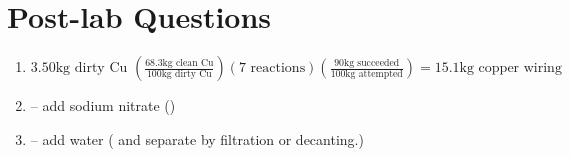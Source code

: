 \documentclass[11pt,letterpaper]{report}
\begin{document}
\section*{Post-lab Questions}
\begin{enumerate}
\item $3.50 \text{kg dirty Cu } (\frac{68.3 \text{kg clean Cu}}{100 \text{kg dirty Cu}}) (7 \text{ reactions}) (\frac{90 \text{kg succeeded}}{100 \text{kg attempted}}) = 15.1 \text{kg copper wiring}$ \\
\item {} -- add sodium nitrate () \\
\item {} -- add water ( and separate by filtration or decanting.)
\end{enumerate}
\end{document}
